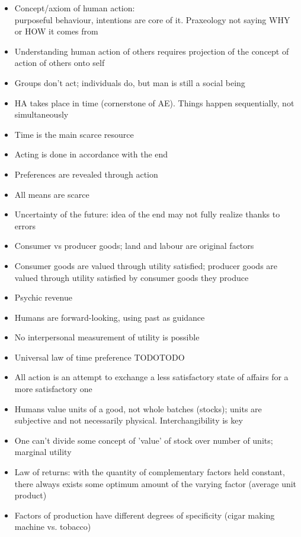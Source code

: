 \documentclass[]{article}
\begin{document}
\begin{itemize}
    \item Concept/axiom of human action: \\ purposeful behaviour, intentions are core of it. Praxeology not saying WHY or HOW it comes from
    \item Understanding human action of others requires projection of the concept of action of others onto self
    \item Groups don't act; individuals do, but man is still a social being
    \item HA takes place in time (cornerstone of AE). Things happen sequentially, not simultaneously
    \item Time is the main scarce resource
    \item Acting is done in accordance with the end
    \item Preferences are revealed through action
    \item All means are scarce
    \item Uncertainty of the future: idea of the end may not fully realize thanks to errors
    \item Consumer vs producer goods; land and labour are original factors
    \item Consumer goods are valued through utility satisfied; producer goods are valued through utility satisfied by consumer goods they produce
    \item Psychic revenue
    \item Humans are forward-looking, using past as guidance
    \item No interpersonal measurement of utility is possible
    \item Universal law of time preference TODOTODO
    \item All action is an attempt to exchange a less satisfactory state of affairs for a more satisfactory one
    \item Humans value units of a good, not whole batches (stocks); units are subjective and not necessarily physical. Interchangibility is key
    \item One can't divide some concept of 'value' of stock over number of units; marginal utility
    \item Law of returns: with the quantity of complementary factors held constant, there always exists some optimum amount of the varying factor (average unit product)
    \item Factors of production have different degrees of specificity (cigar making machine vs. tobacco)

\end{itemize}
\end{document}
